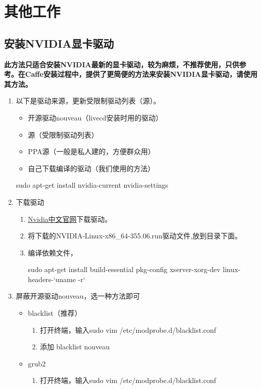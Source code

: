 \section{其他工作}
\subsection{安装NVIDIA显卡驱动}
\textbf{此方法只适合安装NVIDIA最新的显卡驱动，较为麻烦，不推荐使用，只供参考。在Caffe安装过程中，提供了更简便的方法来安装NVIDIA显卡驱动，请使用其方法。}
\begin{enumerate}
\item 以下是驱动来源，更新受限制驱动列表（源）。
\begin{itemize}
\item 开源驱动nouveau（livecd安装时用的驱动）
\item 源（受限制驱动列表）
\item PPA源（一般是私人建的，方便群众用）
\item 自己下载编译的驱动（我们使用的方法）
\end{itemize}
\begin{bash}
sudo apt-get install nvidia-current nvidia-settings
\end{bash}
\item 下载驱动
	\begin{enumerate}
	\item \href{http://www.nvidia.cn/page/home.html}{Nvidia中文官网}下载驱动。
	\item 将下载的NVIDIA-Linux-x86\_64-355.06.run驱动文件,放到{\color{blue}{/home/用户名/}}目录下面。
	\item 编译依赖文件，
	\begin{bash}
	sudo apt-get install build-essential pkg-config xserver-xorg-dev linux-headers-`uname -r`
	\end{bash}
	\end{enumerate}
\item 屏蔽开源驱动nouveau，选一种方法即可
	\begin{itemize}
	\item blacklist（推荐）
	    \begin{enumerate}
	    \item 打开终端，输入sudo vim /etc/modprobe.d/blacklist.conf
	    \item 添加 blacklist nouveau
	    \end{enumerate}
	\item grub2
	    \begin{enumerate}
	    \item 打开终端，输入sudo vim /etc/modprobe.d/blacklist.conf

\end{enumerate}
\end{itemize}
\end{enumerate}
